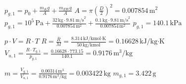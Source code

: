 \( p_{g,1} = p_0 + \frac{m_K g}{A} + \frac{m_{EW} g}{A} \)  
\( A = \pi \left(\frac{D}{2}\right)^2 = 0.007854 \, \text{m}^2 \)  
\( p_{g,1} = 10^5 \, \text{Pa} + \frac{32 \, \text{kg} \cdot 9.81 \, \text{m/s}^2}{0.007854 \, \text{m}^2} + \frac{0.1 \, \text{kg} \cdot 9.81 \, \text{m/s}^2}{0.007854 \, \text{m}^2} \)  
\( p_{g,1} = 140.1 \, \text{kPa} \)  

\( p \cdot V = R \cdot T \)  
\( R = \frac{\bar{R}}{M} = \frac{8.314 \, \text{kJ/kmol·K}}{50 \, \text{kg/kmol}} = 0.16628 \, \text{kJ/kg·K} \)  
\( V_{u,1} = \frac{R \cdot T_{g,1}}{p_{g,1}} = \frac{0.16628 \cdot 773.15}{140.1} = 0.9176 \, \text{m}^3/\text{kg} \)  

\( m = \frac{V_{g,1}}{V_{u,1}} = \frac{0.00314 \, \text{m}^3}{0.9176 \, \text{m}^3/\text{kg}} = 0.003422 \, \text{kg} \)  
\( m_{g,1} = 3.422 \, \text{g} \)